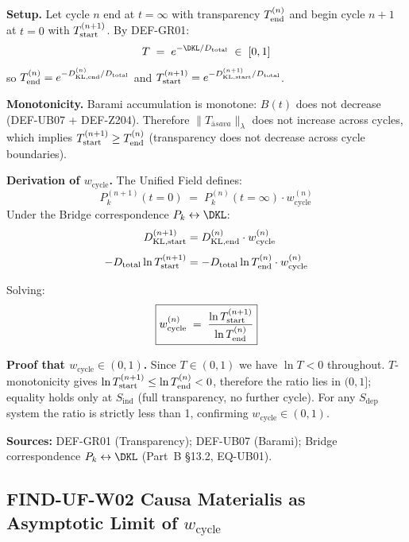 \documentclass[12pt, a4paper]{article}
\providecommand{\Sind}{S_{\mathrm{ind}}}
\providecommand{\Sdep}{S_{\mathrm{dep}}}
\providecommand{\Tasava}{T_{\bar{\mathrm{a}}sava}}
\providecommand{\wcyc}{w_{\mathrm{cycle}}}
\providecommand{\Tasava}{\mathcal{T}_{\!\mathrm{\bar{a}sava}}}
\begin{document}
\begin{derivedbox}[title={FIND-UF-W01: $\wcyc \in (0,1)$ from
  $T$-Monotonicity}]
\textbf{Setup.}
Let cycle $n$ end at $t = \infty$ with transparency
$T^{(n)}_{\rm end}$ and begin cycle $n{+}1$ at $t = 0$ with
$T^{(n+1)}_{\rm start}$.
By DEF-GR01:
\[
  T \;=\; e^{-\DKL/D_{\rm total}} \;\in\; [0,1]
\]
so $T^{(n)}_{\rm end} = e^{-D^{(n)}_{\rm KL,end}/D_{\rm total}}$
and $T^{(n+1)}_{\rm start} = e^{-D^{(n+1)}_{\rm KL,start}/D_{\rm total}}$.

\textbf{Monotonicity.}
Barami accumulation is monotone: $B(t)$ does not decrease
(DEF-UB07 + DEF-Z204). Therefore $\|\Tasava\|_{\lambda}$ does not
increase across cycles, which implies
$T^{(n+1)}_{\rm start} \geq T^{(n)}_{\rm end}$
(transparency does not decrease across cycle boundaries).

\textbf{Derivation of $\wcyc$.}
The Unified Field defines:
\[
  P_k^{(n+1)}(t=0) \;=\; P_k^{(n)}(t=\infty)\cdot \wcyc^{(n)}
\]
Under the Bridge correspondence $P_k \leftrightarrow \DKL$:
\begin{align*}
  D^{(n+1)}_{\rm KL,start}
    &= D^{(n)}_{\rm KL,end}\cdot\wcyc^{(n)}\\[4pt]
  -D_{\rm total}\ln T^{(n+1)}_{\rm start}
    &= -D_{\rm total}\ln T^{(n)}_{\rm end}\cdot\wcyc^{(n)}
\end{align*}

Solving:
\[
  \boxed{
    \wcyc^{(n)} \;=\;
    \frac{\ln T^{(n+1)}_{\rm start}}{\ln T^{(n)}_{\rm end}}
  }
\]

\textbf{Proof that $\wcyc \in (0,1)$.}
Since $T \in (0,1)$ we have $\ln T < 0$ throughout.
$T$-monotonicity gives
$\ln T^{(n+1)}_{\rm start} \leq \ln T^{(n)}_{\rm end} < 0$,
therefore the ratio lies in $(0, 1]$; equality holds only at
$\Sind$ (full transparency, no further cycle).
For any $\Sdep$ system the ratio is strictly less than 1,
confirming $\wcyc \in (0, 1)$.

\textbf{Sources:} DEF-GR01 (Transparency); DEF-UB07 (Barami);
Bridge correspondence $P_k \leftrightarrow \DKL$
(Part~B \S13.2, EQ-UB01).
\end{derivedbox}

\subsection{FIND-UF-W02 \quad
         Causa Materialis as Asymptotic Limit of \texorpdfstring{$\wcyc$}{w\_cycle}}
\end{document}
